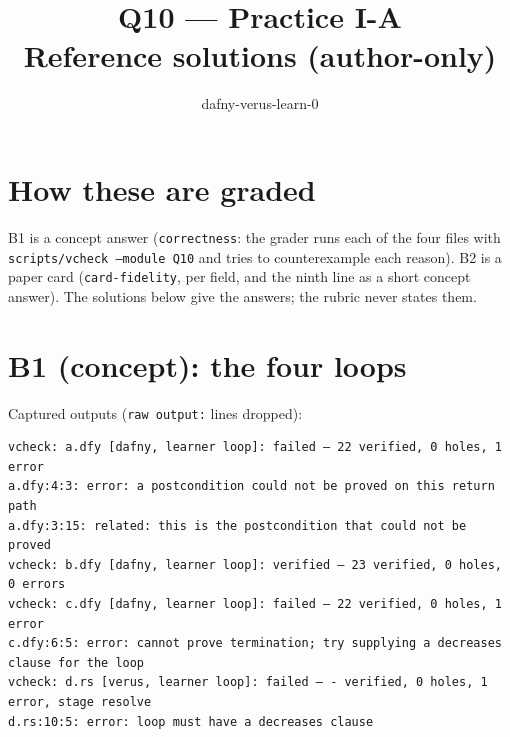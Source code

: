 \documentclass[11pt]{article}
\title{Q10 --- Practice I-A \\ \large Reference solutions (author-only)}
\author{dafny-verus-learn-0}
\date{}
\begin{document}
\maketitle
\sloppy

\section*{How these are graded}
B1 is a concept answer (\texttt{correctness}: the grader runs each of the four
files with \texttt{scripts/vcheck --module Q10} and tries to counterexample
each reason). B2 is a paper card (\texttt{card-fidelity}, per field, and the
ninth line as a short concept answer). The solutions below give the answers;
the rubric never states them.

\section*{B1 (concept): the four loops}

Captured outputs (\texttt{raw output:} lines dropped):
{\small
\begin{verbatim}
vcheck: a.dfy [dafny, learner loop]: failed — 22 verified, 0 holes, 1 error
a.dfy:4:3: error: a postcondition could not be proved on this return path
a.dfy:3:15: related: this is the postcondition that could not be proved
vcheck: b.dfy [dafny, learner loop]: verified — 23 verified, 0 holes, 0 errors
vcheck: c.dfy [dafny, learner loop]: failed — 22 verified, 0 holes, 1 error
c.dfy:6:5: error: cannot prove termination; try supplying a decreases clause for the loop
vcheck: d.rs [verus, learner loop]: failed — - verified, 0 holes, 1 error, stage resolve
d.rs:10:5: error: loop must have a decreases clause
\end{verbatim}
}
\end{document}
